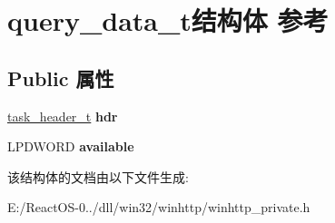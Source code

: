 \hypertarget{structquery__data__t}{}\section{query\+\_\+data\+\_\+t结构体 参考}
\label{structquery__data__t}
\subsection*{Public 属性}
\begin{DoxyCompactItemize}
\item 
\mbox{\label{structquery__data__t_ad3a823e6431b4403dd088f424b35ad94}} 
\hyperlink{structtask__header__t}{task\+\_\+header\+\_\+t} {\bfseries hdr}
\item 
\mbox{\label{structquery__data__t_ac65b8dd80429ca692daf7ac2688728ba}} 
L\+P\+D\+W\+O\+RD {\bfseries available}
\end{DoxyCompactItemize}


该结构体的文档由以下文件生成\+:\begin{DoxyCompactItemize}
\item 
E\+:/\+React\+O\+S-\/0../dll/win32/winhttp/winhttp\+\_\+private.\+h\end{DoxyCompactItemize}
